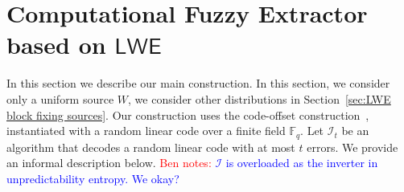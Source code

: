 \documentclass[11pt]{article}
\newcommand{\secref}[1]{\mbox{Section~\ref{#1}}}
\newcommand{\defref}[1]{\mbox{Definition~\ref{#1}}}
\newcommand{\consref}[1]{\mbox{Construction~\ref{#1}}}
\newcommand{\class}[1]{{\ensuremath{\mathsf{#1}}}}
\newcommand{\sketch}{\ensuremath{\class{SS}}\xspace}
\newcommand{\rec}{\ensuremath{\class{Rec}}\xspace}
\newcommand{\Fq}{\ensuremath{\mathbb{F}_q}}
\newcommand{\hill}{\ensuremath{\mathtt{HILL}}\xspace}
\newcommand{\LWE}{\class{LWE}}
\newcommand{\authnote}[2]{{\textcolor{red}{\textsf{#1 notes: }\textcolor{blue}{ #2}}\marginpar{\textcolor{red}{\textbf{!!!!!}}}}}
\newcommand{\authnote}[2]{}
\newcommand{\bnote}[1]{{\authnote{Ben}{#1}}}
\begin{document}
%

\section{Computational Fuzzy Extractor based on \class{LWE}}
\label{sec:fuzzyCompExt}

In this section we describe our main construction.  In this section, we consider only a uniform source $W$, we consider other distributions in \secref{sec:LWE block fixing sources}.  Our construction uses the code-offset construction~\cite{JW99},\cite[Section 5]{DBLP:journals/siamcomp/DodisORS08} instantiated with a random linear code over a finite field $\Fq$.   Let $\mathcal{I}_t$ be an algorithm that decodes a random linear code with at most $t$ errors.  We provide an informal description below.
\bnote{$\mathcal{I}$ is overloaded as the inverter in unpredictability entropy.  We okay?}
\end{document}
